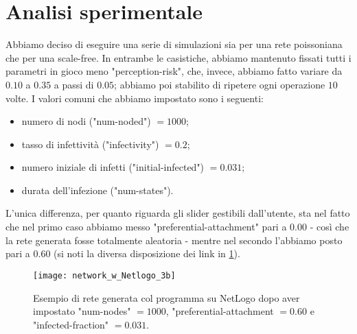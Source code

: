 \section{Analisi sperimentale}
Abbiamo deciso di eseguire una serie di simulazioni sia per una rete poissoniana che per una scale-free. In entrambe le casistiche, abbiamo mantenuto fissati tutti i parametri in gioco meno "perception-risk", che, invece, abbiamo fatto variare da $ 0.10 $ a $ 0.35 $ a passi di $ 0.05 $; abbiamo poi stabilito di ripetere ogni operazione $ 10 $ volte. I valori comuni che abbiamo impostato sono i seguenti:
\begin{itemize}
\item numero di nodi ("num-noded") $ = 1000 $;
\item tasso di infettività ("infectivity") $ = 0.2 $;
\item numero iniziale di infetti ("initial-infected") $ = 0.031 $;
\item durata dell'infezione ("num-states").
\end{itemize}
%
L'unica differenza, per quanto riguarda gli slider gestibili dall'utente, sta nel fatto che nel primo caso abbiamo messo "preferential-attachment" pari a $ 0.00 $  - così che la rete generata fosse totalmente aleatoria - mentre nel secondo l'abbiamo posto pari a $ 0.60 $ (si noti la diversa disposizione dei link in \cref{fig:NetLogo2}).
\begin{figure}[t]
		\begin{center}
			\texttt{[image: network\_w\_Netlogo\_3b]}
			\caption{Esempio di rete generata col programma su NetLogo dopo aver impostato "num-nodes" $= 1000 $, "preferential-attachment $= 0.60 $ e "infected-fraction" $= 0.031 $.}
			\label{fig:NetLogo2}
		\end{center}
\end{figure}
